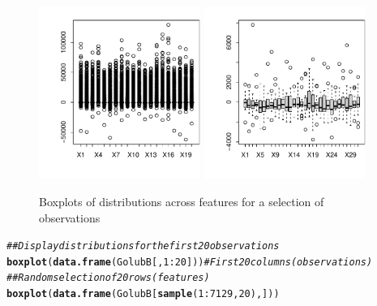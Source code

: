 \documentclass{article}\usepackage[]{graphicx}\usepackage[]{xcolor}
\makeatletter
\newcommand{\hlnum}[1]{\textcolor[rgb]{0.686,0.059,0.569}{#1}}%
\newcommand{\hlcom}[1]{\textcolor[rgb]{0.678,0.584,0.686}{\textit{#1}}}%
\newcommand{\hlopt}[1]{\textcolor[rgb]{0,0,0}{#1}}%
\newcommand{\hlstd}[1]{\textcolor[rgb]{0.345,0.345,0.345}{#1}}%
\newcommand{\hlkwd}[1]{\textcolor[rgb]{0.737,0.353,0.396}{\textbf{#1}}}%
\newenvironment{kframe}{%
 \def\at@end@of@kframe{}%
 \ifinner\ifhmode%
  \def\at@end@of@kframe{\end{minipage}}%
  \begin{minipage}{\columnwidth}%
 \fi\fi%
 \def\FrameCommand##1{\hskip\@totalleftmargin \hskip-\fboxsep
 \colorbox{shadecolor}{##1}\hskip-\fboxsep
     \hskip-\linewidth \hskip-\@totalleftmargin \hskip\columnwidth}%
 \MakeFramed {\advance\hsize-\width
   \@totalleftmargin\z@ \linewidth\hsize
   \@setminipage}}%
 {\par\unskip\endMakeFramed%
 \at@end@of@kframe}
\newenvironment{knitrout}{}{} %
\makeatother
\begin{document}
\begin{figure}[h]
\begin{knitrout}
\color{fgcolor}

{\centering \includegraphics[width=0.47\textwidth]{figs/key-Boxplots-1} 
\includegraphics[width=0.47\textwidth]{figs/key-Boxplots-2} 

}


\end{knitrout}
\caption{Boxplots of distributions across features for a selection of observations}
\end{figure}

\begin{knitrout}
\color{fgcolor}\begin{kframe}
\begin{alltt}
\hlcom{## Display distributions for the first 20 observations}
\hlkwd{boxplot}\hlstd{(}\hlkwd{data.frame}\hlstd{(GolubB[,} \hlnum{1}\hlopt{:}\hlnum{20}\hlstd{]))}  \hlcom{# First 20 columns (observations)}
\hlcom{## Random selection of 20 rows (features)}
\hlkwd{boxplot}\hlstd{(}\hlkwd{data.frame}\hlstd{(GolubB[}\hlkwd{sample}\hlstd{(}\hlnum{1}\hlopt{:}\hlnum{7129}\hlstd{,} \hlnum{20}\hlstd{), ]))}
\end{alltt}
\end{kframe}
\end{knitrout}
\end{document}
